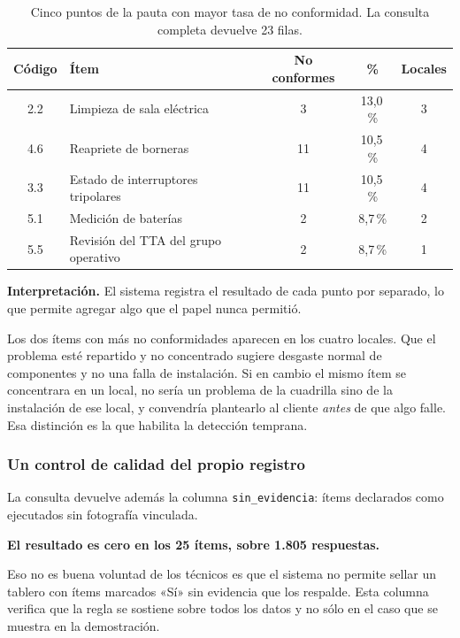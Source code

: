 \documentclass[10pt,letterpaper]{article}
\begin{document}
\begin{table}[H]
\centering
\small
\begin{tabular}{@{}clccc@{}}
\toprule
\textbf{Código} & \textbf{Ítem} & \textbf{No conformes} & \textbf{\%} & \textbf{Locales} \\
\midrule
2.2 & Limpieza de sala eléctrica              & 3  & 13,0\,\% & 3 \\
4.6 & Reapriete de borneras                   & 11 & 10,5\,\% & 4 \\
3.3 & Estado de interruptores tripolares      & 11 & 10,5\,\% & 4 \\
5.1 & Medición de baterías                    & 2  & 8,7\,\%  & 2 \\
5.5 & Revisión del TTA del grupo operativo    & 2  & 8,7\,\%  & 1 \\
\bottomrule
\end{tabular}
\caption{Cinco puntos de la pauta con mayor tasa de no conformidad. La consulta
completa devuelve 23 filas.}
\end{table}

\textbf{Interpretación.} El sistema registra el resultado de cada punto por
separado, lo que permite agregar algo que el papel nunca permitió.

Los dos ítems con más no conformidades aparecen en los cuatro locales. Que el problema esté repartido y no concentrado sugiere desgaste normal de componentes y no una falla de instalación. Si en cambio el mismo ítem se concentrara en un local, no sería un problema de la cuadrilla sino de la instalación de ese local, y convendría plantearlo al cliente \emph{antes} de que algo falle. Esa distinción es la que habilita la detección temprana.

\subsubsection*{Un control de calidad del propio registro}

La consulta devuelve además la columna \texttt{sin\_evidencia}: ítems
declarados como ejecutados sin fotografía vinculada.

\textbf{El resultado es cero en los 25 ítems, sobre 1.805 respuestas.}

Eso no es buena voluntad de los técnicos es que el sistema no permite sellar un tablero con ítems marcados «Sí» sin evidencia que los respalde. Esta columna verifica que la regla se sostiene sobre todos los datos y no sólo en el caso que se muestra en la demostración.
\end{document}
